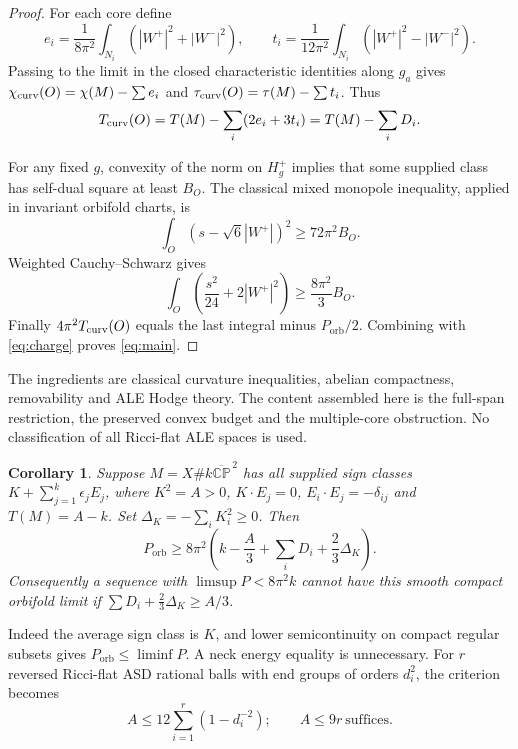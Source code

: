 \documentclass[11pt]{article}
\newtheorem{corollary}[theorem]{Corollary}
\newcommand{\CP}{\mathbb{CP}}
\newcommand{\orb}{\mathrm{orb}}
\begin{document}
\begin{proof}
For each core define
\[
 e_i=\frac1{8\pi^2}\int_{N_i}(|W^+|^2+|W^-|^2),\qquad
 t_i=\frac1{12\pi^2}\int_{N_i}(|W^+|^2-|W^-|^2).
\]
Passing to the limit in the closed characteristic identities along $g_a$
gives $\chi_{\rm curv}(O)=\chi(M)-\sum e_i$ and
$\tau_{\rm curv}(O)=\tau(M)-\sum t_i$.
Thus
\begin{equation}
 T_{\rm curv}(O)=T(M)-\sum_i(2e_i+3t_i)=T(M)-\sum_iD_i.
 \label{eq:charge}
\end{equation}

For any fixed $g$, convexity of the norm on $H_g^+$ implies that some
supplied class has self-dual square at least $B_O$.
The classical mixed monopole inequality, applied in invariant orbifold
charts, is
\[
 \int_O(s-\sqrt6|W^+|)^2\ge72\pi^2B_O.
\]
Weighted Cauchy--Schwarz gives
\[
 \int_O\left(\frac{s^2}{24}+2|W^+|^2\right)
 \ge\frac{8\pi^2}{3}B_O.
\]
Finally $4\pi^2T_{\rm curv}(O)$ equals the last integral minus
$P_{\orb}/2$. Combining with \eqref{eq:charge} proves \eqref{eq:main}.
\end{proof}

The ingredients are classical curvature inequalities, abelian compactness,
removability and ALE Hodge theory. The content assembled here is the
full-span restriction, the preserved convex budget and the multiple-core
obstruction. No classification of all Ricci-flat ALE spaces is used.

\begin{corollary}
Suppose $M=X\#k\overline{\CP}^{\,2}$ has all supplied sign classes
$K+\sum_{j=1}^k\epsilon_jE_j$, where $K^2=A>0$,
$K\cdot E_j=0$, $E_i\cdot E_j=-\delta_{ij}$ and $T(M)=A-k$.
Set $\Delta_K=-\sum_i K_i^2\ge0$. Then
\[
 P_{\orb}\ge8\pi^2\left(k-\frac A3+\sum_iD_i+\frac23\Delta_K\right).
\]
Consequently a sequence with $\limsup P<8\pi^2k$ cannot have this
smooth compact orbifold limit if
$\sum D_i+\frac23\Delta_K\ge A/3$.
\end{corollary}
Indeed the average sign class is $K$, and lower semicontinuity on compact
regular subsets gives $P_{\orb}\le\liminf P$. A neck energy equality is
unnecessary. For $r$ reversed Ricci-flat ASD rational balls with end groups
of orders $d_i^2$, the criterion becomes
\begin{equation}
 A\le12\sum_{i=1}^r(1-d_i^{-2});\qquad A\le9r\ \text{suffices}.
 \label{eq:reverse}
\end{equation}
\end{document}
